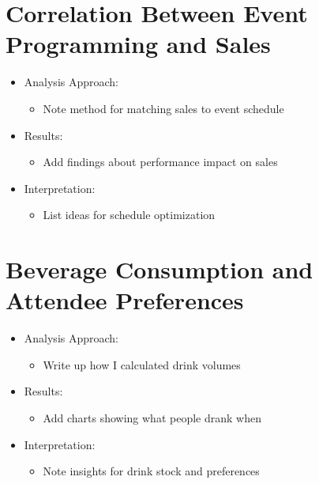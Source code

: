 \section{Correlation Between Event Programming and Sales}
\label{sec:data-analysis-event-programming}
\begin{itemize}
    \item Analysis Approach:
    \begin{itemize}
        \item Note method for matching sales to event schedule
    \end{itemize}

    \item Results:
    \begin{itemize}
        \item Add findings about performance impact on sales
    \end{itemize}

    \item Interpretation:
    \begin{itemize}
        \item List ideas for schedule optimization
    \end{itemize}
\end{itemize}


\section{Beverage Consumption and Attendee Preferences}
\label{sec:data-analysis-beverage-consumption}
\begin{itemize}
    \item Analysis Approach:
    \begin{itemize}
        \item Write up how I calculated drink volumes
    \end{itemize}

    \item Results:
    \begin{itemize}
        \item Add charts showing what people drank when
    \end{itemize}

    \item Interpretation:
    \begin{itemize}
        \item Note insights for drink stock and preferences
    \end{itemize}
\end{itemize}


